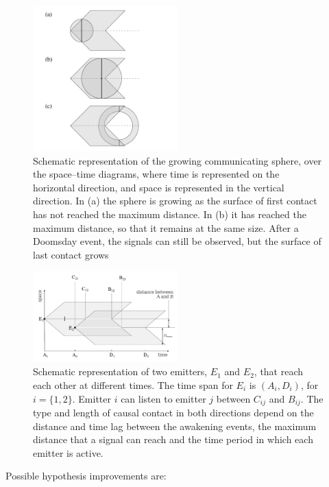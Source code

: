 \documentclass[crop]{CSLB}%
\begin{document}
\begin{figure}
   \centering
   \includegraphics[width=0.5\textwidth]{growingsphere.pdf}
   \caption{Schematic representation of the growing communicating
   sphere, over the space--time diagrams, where time is represented on
   the horizontal direction, and space is represented in the vertical
   direction.  In (a) the sphere is
   growing as the surface of first contact has not reached the maximum
   distance.  In (b) it has reached the maximum distance, so that it
   remains at the same size.  After a Doomsday event, the signals can
   still be observed, but the surface of last contact grows }
   \label{F_sphere}
\end{figure}

  
\begin{figure}
   \centering
   \includegraphics[width=0.5\textwidth]{abcd.pdf}
   \caption{Schematic representation of two emitters, $E_1$ and $E_2$,
   that reach each other at different times.  The time span for $E_i$
   is $(A_i, D_i)$, for $i=\{1,2\}$.  Emitter $i$ can listen to
   emitter $j$ between $C_{ij}$ and $B_{ij}$.
   The type and length of causal contact in both directions depend on
   the distance and time lag between the awakening events, the maximum
   distance that a signal can reach and the time period in which each
   emitter is active.}
   \label{F_abcd}
\end{figure}
                     

Possible hypothesis improvements are:
\end{document}
